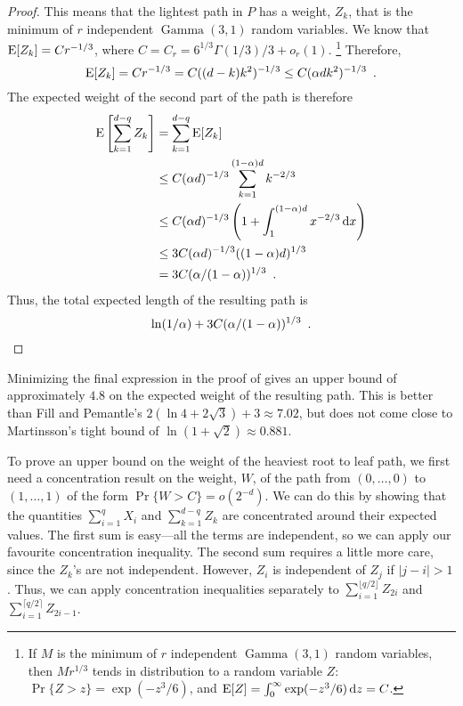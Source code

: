 \documentclass[lotsofwhite]{patmorin}
\DeclareMathOperator{\gammarv}{Gamma}
\begin{document}
\begin{proof}
This means that the lightest path in $P$ has a weight, $Z_k$, that is
the minimum of $r$ independent $\gammarv(3,1)$ random variables.  We know
that $\mathrm{E}[Z_k]=Cr^{-1/3}$, where $C = C_r = 6^{1/3}\Gamma(1/3)/3 + o_r(1)$.%
\footnote{If $M$ is the minimum of $r$ independent $\gammarv(3,1)$ random
variables, then $Mr^{1/3}$ tends in distribution to a random variable
$Z$: $\Pr\{Z>z\} = \exp(-z^3/6)$, and $\mathrm{E}[Z]= \int_0^\infty \exp(-z^3/6)\,
\mathrm{d}z = C$.}
Therefore,
\[
    \mathrm{E}[Z_k] = Cr^{-1/3} = C((d-k)k^2)^{-1/3} \le C(\alpha dk^2)^{-1/3} \enspace .
\]
The expected weight of the second part of the path is therefore
\begin{align*}
 \mathrm{E}\left[\sum_{k=1}^{d-q} Z_k\right] 
    & = \sum_{k=1}^{d-q} \mathrm{E}[Z_k] \\
    & \le C(\alpha d)^{-1/3}\sum_{k=1}^{(1-\alpha)d} k^{-2/3} \\
    & \le C(\alpha d)^{-1/3}\left(1+\int_1^{(1-\alpha)d} x^{-2/3}\,\mathrm{d}x\right) \\
    & \le 3C(\alpha d)^{-1/3}((1-\alpha)d)^{1/3} \\
    & = 3C(\alpha /(1-\alpha))^{1/3} \enspace .
\end{align*}
Thus, the total expected length of the resulting path is
\[
    \ln(1/\alpha) + 3C(\alpha /(1-\alpha))^{1/3} \enspace . \qedhere
\]
\end{proof}

Minimizing the final expression in the proof of 
gives an upper bound of approximately $4.8$ on the expected weight of
the resulting path.  This is better than Fill and Pemantle's $2(\ln
4+2\sqrt{3})+3\approx 7.02$, but does not come close to Martinsson's
tight bound of $\ln(1+\sqrt{2})\approx 0.881$.

To prove an upper bound on the weight of the heaviest root to leaf path,
we first need a concentration result on the weight, $W$, of the path from
$(0,\ldots,0)$ to $(1,\ldots,1)$ of the form $\Pr\{W > C\} = o(2^{-d})$.
We can do this by showing that the quantities $\sum_{i=1}^q X_i$ and
$\sum_{k=1}^{d-q} Z_k$ are concentrated around their expected values.
The first sum is easy---all the terms are independent, so we can apply
our favourite concentration inequality.  The second sum requires a
little more care, since the $Z_k$'s are not independent. However, $Z_i$
is independent of $Z_j$ if $|j-i| > 1$. Thus, we can apply concentration
inequalities separately to $\sum_{i=1}^{\lfloor q/2\rfloor} Z_{2i}$
and $\sum_{i=1}^{\lceil q/2\rceil} Z_{2i-1}$.
\end{document}
